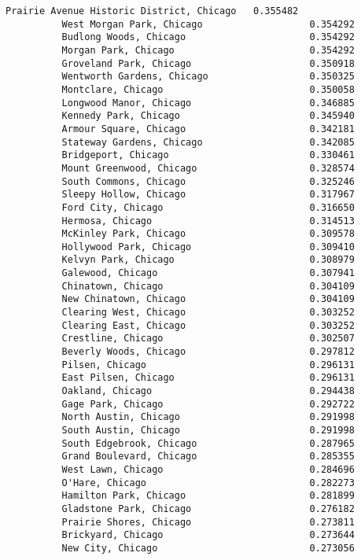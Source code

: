 \documentclass[11pt]{article}
\begin{document}
\begin{Verbatim}[commandchars=\\\{\}]
          Prairie Avenue Historic District, Chicago   0.355482
          West Morgan Park, Chicago                   0.354292
          Budlong Woods, Chicago                      0.354292
          Morgan Park, Chicago                        0.354292
          Groveland Park, Chicago                     0.350918
          Wentworth Gardens, Chicago                  0.350325
          Montclare, Chicago                          0.350058
          Longwood Manor, Chicago                     0.346885
          Kennedy Park, Chicago                       0.345940
          Armour Square, Chicago                      0.342181
          Stateway Gardens, Chicago                   0.342085
          Bridgeport, Chicago                         0.330461
          Mount Greenwood, Chicago                    0.328574
          South Commons, Chicago                      0.325246
          Sleepy Hollow, Chicago                      0.317967
          Ford City, Chicago                          0.316650
          Hermosa, Chicago                            0.314513
          McKinley Park, Chicago                      0.309578
          Hollywood Park, Chicago                     0.309410
          Kelvyn Park, Chicago                        0.308979
          Galewood, Chicago                           0.307941
          Chinatown, Chicago                          0.304109
          New Chinatown, Chicago                      0.304109
          Clearing West, Chicago                      0.303252
          Clearing East, Chicago                      0.303252
          Crestline, Chicago                          0.302507
          Beverly Woods, Chicago                      0.297812
          Pilsen, Chicago                             0.296131
          East Pilsen, Chicago                        0.296131
          Oakland, Chicago                            0.294438
          Gage Park, Chicago                          0.292722
          North Austin, Chicago                       0.291998
          South Austin, Chicago                       0.291998
          South Edgebrook, Chicago                    0.287965
          Grand Boulevard, Chicago                    0.285355
          West Lawn, Chicago                          0.284696
          O'Hare, Chicago                             0.282273
          Hamilton Park, Chicago                      0.281899
          Gladstone Park, Chicago                     0.276182
          Prairie Shores, Chicago                     0.273811
          Brickyard, Chicago                          0.273644
          New City, Chicago                           0.273056

\end{Verbatim}
\end{document}
